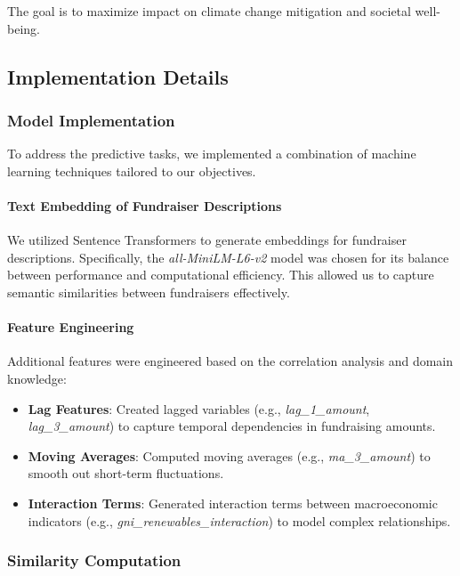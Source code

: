 \documentclass[sigconf]{acmart}
\begin{document}
The goal is to maximize impact on climate change mitigation and societal well-being.

\subsection{Implementation Details}

\subsubsection{Model Implementation}

To address the predictive tasks, we implemented a combination of machine learning techniques tailored to our objectives.

\paragraph{Text Embedding of Fundraiser Descriptions}

We utilized Sentence Transformers \cite{reimers-2019-sentence-bert} to generate embeddings for fundraiser descriptions. Specifically, the \textit{all-MiniLM-L6-v2} model was chosen for its balance between performance and computational efficiency. This allowed us to capture semantic similarities between fundraisers effectively.

\paragraph{Feature Engineering}

Additional features were engineered based on the correlation analysis and domain knowledge:

\begin{itemize}
    \item \textbf{Lag Features}: Created lagged variables (e.g., \textit{lag\_1\_amount}, \textit{lag\_3\_amount}) to capture temporal dependencies in fundraising amounts.
    \item \textbf{Moving Averages}: Computed moving averages (e.g., \textit{ma\_3}\linebreak\textit{\_amount}) to smooth out short-term fluctuations.
    \item \textbf{Interaction Terms}: Generated interaction terms between macroeconomic indicators (e.g., \textit{gni\_renewables\_interaction}) to model complex relationships.
\end{itemize}

\subsubsection{Similarity Computation}
\end{document}
